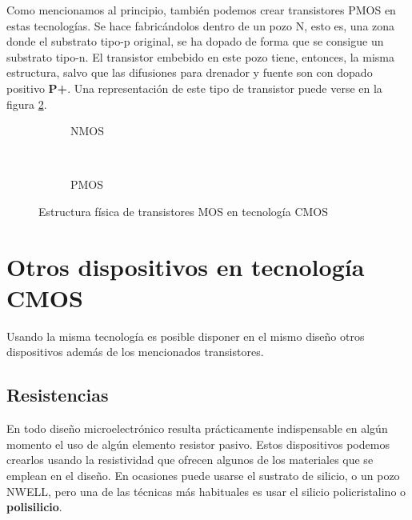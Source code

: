 Como mencionamos al principio, también podemos crear transistores PMOS en estas
tecnologías. Se hace fabricándolos dentro de un pozo N, esto es, una zona
donde el substrato tipo-p original, se ha dopado de forma que se consigue un substrato
tipo-n. El transistor embebido en este pozo tiene, entonces, la misma estructura,
salvo que las difusiones para drenador y fuente son con dopado positivo \textbf{P+}.
Una representación de este tipo de transistor puede verse en la figura \ref{fig:pmos}.\\

\begin{figure}[h]
	\centering
	\begin{subfigure}{0.45\textwidth}
		
		\caption{NMOS}
		\label{fig:nmos}
	\end{subfigure}
	~ %
	\begin{subfigure}{0.45\textwidth}
		
		\caption{PMOS}
		\label{fig:pmos}
	\end{subfigure}
	\caption[Estructura física de transistores NMOS y PMOS]
	{Estructura física de transistores MOS en tecnología CMOS}
	\label{fig:cmos_transistors}
\end{figure}

\section{Otros dispositivos en tecnología CMOS}\label{cap:otros_dispositivos}

Usando la misma tecnología es posible disponer en el mismo diseño otros dispositivos
además de los mencionados transistores.\\

\subsection{Resistencias}
En todo diseño microelectrónico resulta prácticamente indispensable en algún
momento el uso de algún elemento resistor pasivo. Estos dispositivos podemos
crearlos usando la resistividad que ofrecen algunos de los materiales que se emplean
en el diseño. En ocasiones puede usarse el sustrato de silicio, o un pozo NWELL, pero
una de las técnicas más habituales es usar el silicio policristalino o \textbf{polisilicio}.\\

